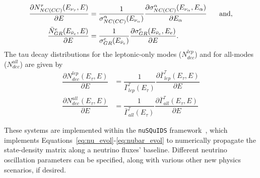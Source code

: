 \documentclass[main.tex]{subfiles}
\begin{document}
\begin{align}
    \dfrac{\partial N_{NC(CC)}^{\tau} (E_{\nu_{\tau}}, E)}{\partial E} &= \dfrac{1}{\sigma_{NC(CC)}^{\alpha} (E_{\nu_{\alpha} })}\dfrac{\partial\sigma_{NC(CC)}^{\alpha}(E_{\nu_{\alpha}}, E_{\alpha})}{\partial E_{\alpha}}\hspace{0.5cm} \text{ and}, \\
    \dfrac{\bar{N}_{GR}^{e} (E_{\bar{\nu}_{e}}, E)}{\partial E} &= \dfrac{1}{\sigma_{GR}^{e}(E_{\bar{\nu}_{e}})} \dfrac{\partial\sigma_{GR}^{e}(E_{\bar{\nu}_{e}}, E_{e})}{\partial E}.
\end{align}
The tau decay distributions for the leptonic-only modes ($N_{dec}^{lep}$) and for all-modes ($N_{dec}^{all}$) are given by 
\begin{align}
    \dfrac{\partial N_{dec}^{lep}(E_{\tau}, E)}{\partial E} &= \dfrac{1}{\bar{\Gamma}_{lep}^{\tau}(E_{\tau})} \dfrac{\partial\bar{\Gamma}_{lep}^{\tau}(E_{\tau},E)}{\partial E} \\
    \dfrac{\partial N_{dec}^{all}(E_{\tau}, E)}{\partial E} &= \dfrac{1}{\bar{\Gamma}_{all}^{\tau}(E_{\tau})} \dfrac{\partial\bar{\Gamma}_{all}^{\tau}(E_{\tau},E)}{\partial E} 
\end{align}

These systems are implemented within the \texttt{nuSQuIDS} framework~\cite{arguelles:2015nu, arguelles2021nusquids}, which implements Equations~\eqref{eq:nu_evol}-\eqref{eq:nubar_evol} to numerically propagate the state-density matrix along a neutrino fluxes' baseline. 
Different neutrino oscillation parameters can be specified, along with various other new physics scenarios, if desired.
\end{document}
